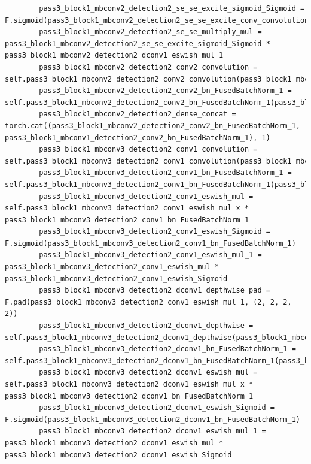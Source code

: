 \documentclass{fisatprojectfinal}
\begin{document}
\begin{appendices}
\begin{lstlisting}
        pass3_block1_mbconv2_detection2_se_se_excite_sigmoid_Sigmoid = F.sigmoid(pass3_block1_mbconv2_detection2_se_se_excite_conv_convolution)
        pass3_block1_mbconv2_detection2_se_se_multiply_mul = pass3_block1_mbconv2_detection2_se_se_excite_sigmoid_Sigmoid * pass3_block1_mbconv2_detection2_dconv1_eswish_mul_1
        pass3_block1_mbconv2_detection2_conv2_convolution = self.pass3_block1_mbconv2_detection2_conv2_convolution(pass3_block1_mbconv2_detection2_se_se_multiply_mul)
        pass3_block1_mbconv2_detection2_conv2_bn_FusedBatchNorm_1 = self.pass3_block1_mbconv2_detection2_conv2_bn_FusedBatchNorm_1(pass3_block1_mbconv2_detection2_conv2_convolution)
        pass3_block1_mbconv2_detection2_dense_concat = torch.cat((pass3_block1_mbconv2_detection2_conv2_bn_FusedBatchNorm_1, pass3_block1_mbconv1_detection2_conv2_bn_FusedBatchNorm_1), 1)
        pass3_block1_mbconv3_detection2_conv1_convolution = self.pass3_block1_mbconv3_detection2_conv1_convolution(pass3_block1_mbconv2_detection2_dense_concat)
        pass3_block1_mbconv3_detection2_conv1_bn_FusedBatchNorm_1 = self.pass3_block1_mbconv3_detection2_conv1_bn_FusedBatchNorm_1(pass3_block1_mbconv3_detection2_conv1_convolution)
        pass3_block1_mbconv3_detection2_conv1_eswish_mul = self.pass3_block1_mbconv3_detection2_conv1_eswish_mul_x * pass3_block1_mbconv3_detection2_conv1_bn_FusedBatchNorm_1
        pass3_block1_mbconv3_detection2_conv1_eswish_Sigmoid = F.sigmoid(pass3_block1_mbconv3_detection2_conv1_bn_FusedBatchNorm_1)
        pass3_block1_mbconv3_detection2_conv1_eswish_mul_1 = pass3_block1_mbconv3_detection2_conv1_eswish_mul * pass3_block1_mbconv3_detection2_conv1_eswish_Sigmoid
        pass3_block1_mbconv3_detection2_dconv1_depthwise_pad = F.pad(pass3_block1_mbconv3_detection2_conv1_eswish_mul_1, (2, 2, 2, 2))
        pass3_block1_mbconv3_detection2_dconv1_depthwise = self.pass3_block1_mbconv3_detection2_dconv1_depthwise(pass3_block1_mbconv3_detection2_dconv1_depthwise_pad)
        pass3_block1_mbconv3_detection2_dconv1_bn_FusedBatchNorm_1 = self.pass3_block1_mbconv3_detection2_dconv1_bn_FusedBatchNorm_1(pass3_block1_mbconv3_detection2_dconv1_depthwise)
        pass3_block1_mbconv3_detection2_dconv1_eswish_mul = self.pass3_block1_mbconv3_detection2_dconv1_eswish_mul_x * pass3_block1_mbconv3_detection2_dconv1_bn_FusedBatchNorm_1
        pass3_block1_mbconv3_detection2_dconv1_eswish_Sigmoid = F.sigmoid(pass3_block1_mbconv3_detection2_dconv1_bn_FusedBatchNorm_1)
        pass3_block1_mbconv3_detection2_dconv1_eswish_mul_1 = pass3_block1_mbconv3_detection2_dconv1_eswish_mul * pass3_block1_mbconv3_detection2_dconv1_eswish_Sigmoid

\end{lstlisting}
\end{appendices}
\end{document}
